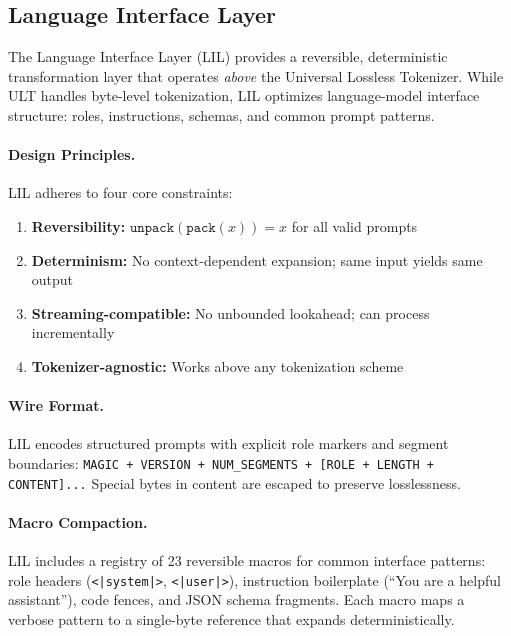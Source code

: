 
\subsection{Language Interface Layer}
\label{sec:lil}

The Language Interface Layer (LIL) provides a reversible, deterministic transformation
layer that operates \emph{above} the Universal Lossless Tokenizer. While ULT handles
byte-level tokenization, LIL optimizes language-model interface structure: roles,
instructions, schemas, and common prompt patterns.

\paragraph{Design Principles.}
LIL adheres to four core constraints:
\begin{enumerate}
\item \textbf{Reversibility:} $\texttt{unpack}(\texttt{pack}(x)) = x$ for all valid prompts
\item \textbf{Determinism:} No context-dependent expansion; same input yields same output
\item \textbf{Streaming-compatible:} No unbounded lookahead; can process incrementally
\item \textbf{Tokenizer-agnostic:} Works above any tokenization scheme
\end{enumerate}

\paragraph{Wire Format.}
LIL encodes structured prompts with explicit role markers and segment boundaries:
\texttt{MAGIC + VERSION + NUM\_SEGMENTS + [ROLE + LENGTH + CONTENT]...}
Special bytes in content are escaped to preserve losslessness.

\paragraph{Macro Compaction.}
LIL includes a registry of 23 reversible macros for common interface patterns:
role headers (\texttt{<|system|>}, \texttt{<|user|>}), instruction boilerplate
(``You are a helpful assistant''), code fences, and JSON schema fragments.
Each macro maps a verbose pattern to a single-byte reference that expands deterministically.

